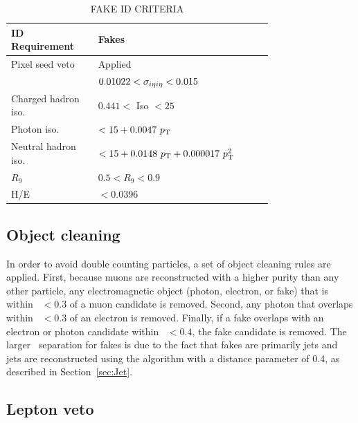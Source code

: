 \begin{table}[ht]
    \caption{FAKE ID CRITERIA}
    \centering
    \begin{tabular}{ |>{\centering\arraybackslash}m{0.25\linewidth}| >{\centering\arraybackslash}m{0.5\linewidth} |}
        \hline
        	\hline
        \textbf{ID Requirement} & \textbf{Fakes} \\ [0.5ex]
        \hline
        	Pixel seed veto    & Applied\\
	\hline
	\sigmaietaieta   & $0.01022 < \sigma_{i\eta i \eta}  < 0.015 $\\
	Charged hadron iso. & $ 0.441 <$ Iso $< 25$\\
	\hline
	Photon iso. &$ < 15 +0.0047~p_{\mathrm{T}}$\\
	Neutral hadron iso. & $< 15 + 0.0148~p_{\mathrm{T}}+0.000017~p_{\mathrm{T}}^2$\\
        $R_9$    & $0.5 < R_9 < 0.9$ \\
        H/E      & $ < 0.0396$\\
           \hline
           \hline
    \end{tabular}
    \label{tab:fakeID}
\end{table}

\subsection{Object cleaning}
\label{sec:ObjCleaning}

In order to avoid double counting particles, a set of object cleaning rules are applied. 
First, because muons are reconstructed with a higher purity than any other particle, 
any electromagnetic object (photon, electron, or fake) that is within \dR~$< 0.3$ of a muon candidate is removed.
Second, any photon that overlaps within \dR~$< 0.3$ of an electron is removed. Finally, if a fake overlaps with an electron or 
photon candidate within \dR~$< 0.4$, the fake candidate is removed. The larger \dR~separation for fakes is due to the fact
that fakes are primarily jets and jets are reconstructed using the \antikt algorithm with a distance
parameter of 0.4, as described in Section~\ref{sec:Jet}.  

\subsection{Lepton veto}
\label{sec:lepVeto}

